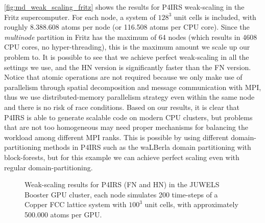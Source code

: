 \documentclass[Afour,sageh,times]{sagej}
\begin{document}
\autoref{fig:md_weak_scaling_fritz} shows the results for P4IRS weak-scaling in the Fritz supercomputer.
For each node, a system of $128^3$ unit cells is included, with roughly 8.388.608 atoms per node (or 116.508 atoms per CPU core).
Since the \emph{multinode} partition in Fritz has the maximum of 64 nodes (which results in 4608 CPU cores, no hyper-threading), this is the maximum amount we scale up our problem to.
It is possible to see that we achieve perfect weak-scaling in all the settings we use, and the \ac{HN} version is significantly faster than the \ac{FN} version.
Notice that atomic operations are not required because we only make use of parallelism through spatial decomposition and message communication with MPI, thus we use distributed-memory parallelism strategy even within the same node and there is no risk of race conditions.
Based on our results, it is clear that P4IRS is able to generate scalable code on modern CPU clusters, but problems that are not too homogeneous may need proper mechanisms for balancing the workload among different MPI ranks.
This is possible by using different domain-partitioning methods in P4IRS such as the waLBerla domain partitioning with block-forests, but for this example we can achieve perfect scaling even with regular domain-partitioning.

\begin{figure}[t]
\centering
{}
\vspace{-2ex}
\caption{Weak-scaling results for P4IRS (FN and HN) in the JUWELS Booster GPU cluster, each node simulates 200 time-steps of a Copper FCC lattice system with $100^3$ unit cells, with approximately 500.000 atoms per GPU.}
\vspace{-2ex}
\label{fig:md_weak_scaling_juwels}
\end{figure}
\end{document}
